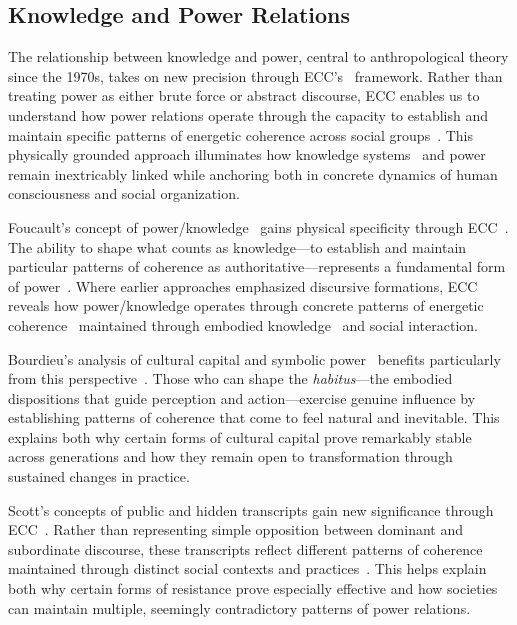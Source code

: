 \subsection*{Knowledge and Power Relations}

The relationship between knowledge and power, central to anthropological theory since the 1970s, takes on new precision through ECC's~ framework. Rather than treating power as either brute force or abstract discourse, ECC enables us to understand how power relations operate through the capacity to establish and maintain specific patterns of energetic coherence across social groups~\cite{foucault1980power,wolf1999envisioning}. This physically grounded approach illuminates how knowledge systems~ and power remain inextricably linked while anchoring both in concrete dynamics of human consciousness and social organization.

Foucault's concept of power/knowledge~ gains physical specificity through ECC~\cite{foucault1980power}. The ability to shape what counts as knowledge—to establish and maintain particular patterns of coherence as authoritative—represents a fundamental form of power~\cite{latour2005reassembling}. Where earlier approaches emphasized discursive formations, ECC reveals how power/knowledge operates through concrete patterns of energetic coherence~ maintained through embodied knowledge~ and social interaction.

Bourdieu's analysis of cultural capital and symbolic power~\cite{bourdieu1977outline} benefits particularly from this perspective~\cite{csordas1994embodiment}. Those who can shape the \textit{habitus}—the embodied dispositions that guide perception and action—exercise genuine influence by establishing patterns of coherence that come to feel natural and inevitable. This explains both why certain forms of cultural capital prove remarkably stable across generations and how they remain open to transformation through sustained changes in practice.

Scott's concepts of public and hidden transcripts gain new significance through ECC~\cite{scott1990domination}. Rather than representing simple opposition between dominant and subordinate discourse, these transcripts reflect different patterns of coherence maintained through distinct social contexts and practices~\cite{ong2006neoliberalism}. This helps explain both why certain forms of resistance prove especially effective and how societies can maintain multiple, seemingly contradictory patterns of power relations.


